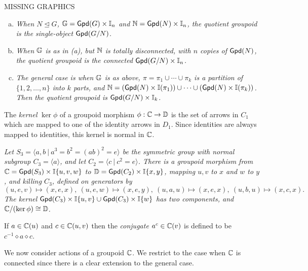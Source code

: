 \begin{center}
MISSING GRAPHICS
\end{center}

\medskip
\begin{example}
\begin{enumerate}[(a)]
\item
\emph{When $N \unlhd G$, $\mathbb{G} = {\sf Gpd}(G)\times\mathbb{I}_n$ and 
$\mathbb{N} = {\sf Gpd}(N)\times\mathbb{I}_n$, the quotient groupoid is 
the single-object ${\sf Gpd}(G/N)$.} 
\item
\emph{When $\mathbb{G}$ is as in (a), but $\mathbb{N}$ is totally disconnected, 
with $n$ copies of ${\sf Gpd}(N)$, the quotient groupoid is the 
connected ${\sf Gpd}(G/N)\times\mathbb{I}_n$.} 
\item
\emph{The general case is when $\mathbb{G}$ is as above, 
$\pi = \pi_1 \cup \cdots \cup \pi_k$ is a partition of $\{1,2,\ldots,n\}$ 
into $k$ parts, and 
$\mathbb{N} = ({\sf Gpd}(N)\times\mathbb{I}(\pi_1))\cup\cdots\cup({\sf Gpd}(N)\times\mathbb{I}(\pi_k))$.  
Then the quotient groupoid is ${\sf Gpd}(G/N)\times\mathbb{I}_k$.} 
\end{enumerate}
\end{example}


\medskip {} 
The \emph{kernel} $\ker\phi$ of a groupoid morphism $\phi : \mathbb{C} \to \mathbb{D}$ 
is the set of arrows in $C_1$ which are mapped to 
one of the identity arrows in $D_1$. 
Since identities are always mapped to identities, 
this kernel is normal in $\mathbb{C}$. 

\begin{example}
\emph{Let $S_3 = \langle a,b ~|~ a^3=b^2=(ab)^2=e \rangle$ 
be the symmetric group with normal subgroup $C_3 = \langle a \rangle$, 
and let $C_2 = \langle c ~|~ c^2=e \rangle$. 
There is a groupoid morphism from $\mathbb{C} = {\sf Gpd}(S_3)\times\mathbb{I}\{u,v,w\}$ 
to $\mathbb{D} = {\sf Gpd}(C_2)\times\mathbb{I}\{x,y\}$, 
mapping $u,v$ to $x$ and $w$ to $y$, and killing $C_3$, 
defined on generators by 
$$
(u,e,v)\mapsto(x,e,x), ~
(u,e,w)\mapsto(x,e,y), ~
(u,a,u)\mapsto(x,e,x), ~ 
(u,b,u)\mapsto(x,c,x).
$$
The kernel ${\sf Gpd}(C_3)\times\mathbb{I}\{u,v\} \cup {\sf Gpd}(C_3)\times\mathbb{I}\{w\}$ 
has two components, and $\mathbb{C}/(\ker\phi)\cong\mathbb{D}$. 
}\end{example}

\medskip
If $a \in \mathbb{C}(u)$ and $c \in \mathbb{C}(u,v)$ then the \emph{conjugate} 
$a^c \in \mathbb{C}(v)$ is defined to be $c^{-1} \diamond a \diamond c$. 

\bigskip
We now consider actions of a groupoid $\mathbb{C}$. 
We restrict to the case when $\mathbb{C}$ is connected 
since there is a clear extension to the general case. 

